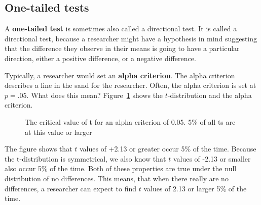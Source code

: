 \documentclass[
  letterpaper,
  DIV=11,
  numbers=noendperiod]{scrreprt}
\begin{document}
\subsection{One-tailed tests}\label{one-tailed-tests}

A \textbf{one-tailed test} is sometimes also called a directional test.
It is called a directional test, because a researcher might have a
hypothesis in mind suggesting that the difference they observe in their
means is going to have a particular direction, either a positive
difference, or a negative difference.

Typically, a researcher would set an \textbf{alpha criterion}. The alpha
criterion describes a line in the sand for the researcher. Often, the
alpha criterion is set at \(p = .05\). What does this mean?
Figure~\ref{fig-7critT} shows the \(t\)-distribution and the alpha
criterion.

\begin{figure}


\caption{\label{fig-7critT}The critical value of t for an alpha
criterion of 0.05. 5\% of all ts are at this value or larger}

\end{figure}%

The figure shows that \(t\) values of +2.13 or greater occur 5\% of the
time. Because the t-distribution is symmetrical, we also know that \(t\)
values of -2.13 or smaller also occur 5\% of the time. Both of these
properties are true under the null distribution of no differences. This
means, that when there really are no differences, a researcher can
expect to find \(t\) values of 2.13 or larger 5\% of the time.
\end{document}
